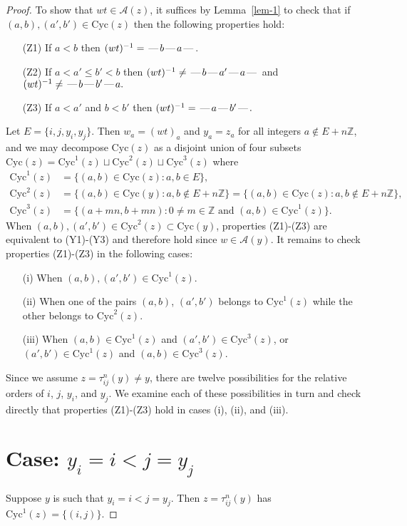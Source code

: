 \documentclass[10pt]{article}
\theoremstyle{definition}
\theoremstyle{definition}
\def\dash{\text{\hspace{0.5mm}---\hspace{0.5mm}}}
\def\Cyc{\mathrm{Cyc}}
\def\ZZ{\mathbb{Z}}
\begin{document}
\begin{proof}
To show that $wt \in \mathcal{A}(z)$, it suffices by Lemma~\ref{lem-1} to check that if
$(a,b),(a',b') \in \Cyc(z)$ then the following properties hold:
\begin{enumerate}
\item[(Z1)] If $a < b$ then $(wt)^{-1} = \dash b \dash a \dash$.
\item[(Z2)] If $a < a' \leq b' < b$ then $(wt)^{-1} \neq \dash b \dash a' \dash a \dash$
and $(wt)^{-1}\neq \dash b \dash b' \dash a.$
\item[(Z3)] If $a < a'$ and $b < b'$ then $(wt)^{-1} = \dash a \dash b' \dash.$
\end{enumerate}
Let $E = \{i, j, y_i, y_j\}$.
Then $w_a = (wt)_a$ and $y_a = z_a$ for all integers $a \notin E + n\ZZ$,
and we may decompose $\Cyc(z)$ as a disjoint union of four subsets
$
\Cyc(z) = \Cyc^1(z) \sqcup \Cyc^2(z) \sqcup \Cyc^3(z)
$
where
\[
\begin{aligned}
\Cyc^1(z) &= \{ (a,b) \in \Cyc(z): a,b \in E\},\\
\Cyc^2(z) &= \{ (a,b) \in \Cyc(y): a,b \notin E + n\ZZ\} =
              \{ (a,b) \in \Cyc(z): a,b \notin E + n\ZZ\},\\
\Cyc^3(z) &= \{ (a+mn,b+mn): 0 \neq m \in \ZZ\text{ and }(a,b)\in \Cyc^1(z)\}.
\end{aligned}
\]
When $(a,b),(a',b') \in \Cyc^2(z)\subset \Cyc(y)$,
properties (Z1)-(Z3) are equivalent to (Y1)-(Y3)
and therefore hold since $w \in \mathcal{A}(y)$.
It remains to check properties (Z1)-(Z3) in the following cases:
\begin{itemize}
\item[(i)] When $(a,b),(a',b') \in \Cyc^1(z)$.
\item[(ii)] When one of the pairs $(a,b)$, $(a',b')$ belongs to $\Cyc^1(z)$
             while the other belongs to $\Cyc^2(z)$.
\item[(iii)] When $(a,b) \in \Cyc^1(z)$ and $(a',b') \in \Cyc^3(z)$,
              or $(a',b') \in \Cyc^1(z)$ and $(a,b) \in \Cyc^3(z)$.
\end{itemize}
Since we assume $z = \tau^n_{ij}(y) \neq y$,
there are twelve possibilities for the relative orders of $i$, $j$, $y_i$, and $y_j$.
We examine each of these possibilities in turn and check directly that
properties (Z1)-(Z3) hold in cases (i), (ii), and (iii).

\section{Case: $y_i = i < j = y_j$}
Suppose $y$ is such that $y_i = i < j = y_j$.
Then $z = \tau^n_{ij}(y)$ has $\Cyc^1(z) = \{(i,j)\}.$

\end{proof}
\end{document}
